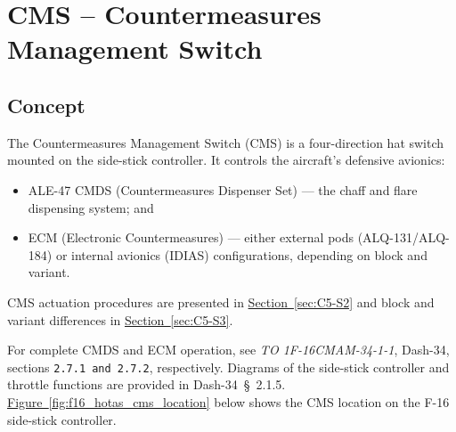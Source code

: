 \documentclass[11pt, a4paper, twoside]{report}
\newcommand{\dashref}[1]{Dash-34~\S~#1}
\newcommand{\dashrefs}[1]{\textit{TO 1F-16CMAM-34-1-1}, Dash-34, sections \texttt{#1}}
\newcommand{\secref}[1]{\hyperref[#1]{Section~\ref*{#1}}}
\newcommand{\figref}[1]{\hyperref[#1]{Figure~\ref*{#1}}}
\begin{document}

\chapter{CMS – Countermeasures Management Switch}
\label{chap:C5}

\section{Concept}
\label{sec:C5-S1}

The Countermeasures Management Switch (CMS) is a four-direction hat switch mounted on the side-stick controller. It controls the aircraft's defensive avionics:

\begin{itemize}
  \item ALE-47 CMDS (Countermeasures Dispenser Set) --- the chaff and flare dispensing system; and
  \item ECM (Electronic Countermeasures) --- either external pods (ALQ-131/ALQ-184) or internal avionics (IDIAS) configurations, depending on block and variant.
\end{itemize}

CMS actuation procedures are presented in \secref{sec:C5-S2} and block and variant differences in \secref{sec:C5-S3}.

For complete CMDS and ECM operation, see \dashrefs{2.7.1 and 2.7.2}, respectively. Diagrams of the side-stick controller and throttle functions are provided in \dashref{2.1.5}. \figref{fig:f16_hotas_cms_location} below shows the CMS location on the F-16 side-stick controller.
\end{document}
